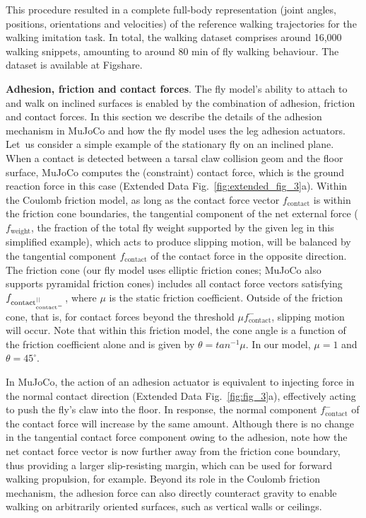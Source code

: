 \documentclass[sn-mathphys-num]{sn-jnl}%
\theoremstyle{thmstyleone}%
\theoremstyle{thmstyletwo}%
\theoremstyle{thmstylethree}%
\begin{document}
This procedure resulted in a complete full-body representation (joint angles, positions, orientations and velocities) of the reference walking trajectories for the walking imitation task. 
In total, the walking dataset comprises around  16,000 walking snippets, amounting to around 80 min of fly walking behaviour.
The dataset is available at Figshare\cite{vaxenburg2025whole}.


\textbf{Adhesion, friction and contact forces}. 
The fly model's ability to attach to and walk on inclined surfaces is enabled by the combination of adhesion, friction and contact forces. 
In this section we describe the details of the adhesion mechanism in MuJoCo and how the fly model uses the leg adhesion actuators. 
Let us consider a simple example of the stationary fly on an inclined plane. 
When a contact is detected between a tarsal claw collision geom and the floor surface, MuJoCo computes the (constraint) contact force, which is the ground reaction force in this case (Extended Data Fig.~\ref{fig:extended_fig_3}a). 
Within the Coulomb friction model, as long as the contact force vector $ f_\text{contact} $ is within the friction cone boundaries, the tangential component of the net external force ($ f_\text{weight} $, the fraction of the total fly weight supported by the given leg in this simplified example), which acts to produce slipping motion, will be balanced by the tangential component $ f_\text{contact} $ of the contact force in the opposite direction. 
The friction cone (our fly model uses elliptic friction cones; 
MuJoCo also supports pyramidal friction cones) includes all contact force vectors satisfying $ f_{\text{contact}^{||} \let \mu f_{\text{contact}^{-}}} $, where $ \mu $ is the static friction coefficient.
Outside of the friction cone, that is, for contact forces beyond the threshold $ \mu f_{\text{contact}}^{-} $, slipping motion will occur.
Note that within this friction model, the cone angle is a function of the friction coefficient alone and is given by $ \theta = tan^{-1} \mu $.
In our model, $ \mu = 1 $ and $ \theta = 45^{\circ} $.


In MuJoCo, the action of an adhesion actuator is equivalent to injecting force in the normal contact direction (Extended Data Fig.~\ref{fig:fig_3}a), effectively acting to push the fly’s claw into the floor. 
In response, the normal component $ f_\text{contact}^{-} $ of the contact force will increase by the same amount. 
Although there is no change in the tangential contact force component owing to the adhesion, note how the net contact force vector is now further away from the friction cone boundary, thus providing a larger slip-resisting margin, which can be used for forward walking propulsion, for example. 
Beyond its role in the Coulomb friction mechanism, the adhesion force can also directly counteract gravity to enable walking on arbitrarily oriented surfaces, such as vertical walls or ceilings.
\end{document}
